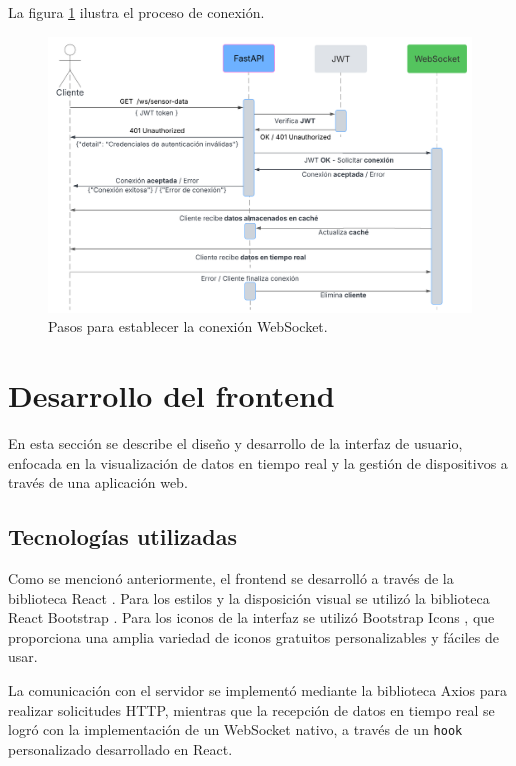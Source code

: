 La figura \ref{fig:websocket} ilustra el proceso de conexión.

\begin{figure}[H]
    \centering
    \includegraphics[width=.90\textwidth]{./Images/23.png}
    \caption{Pasos para establecer la conexión WebSocket.}
    \label{fig:websocket}
\end{figure}

\section{Desarrollo del frontend}

En esta sección se describe el diseño y desarrollo de la interfaz de usuario,
enfocada en la visualización de datos en tiempo real y la gestión de
dispositivos a través de una aplicación web.

\subsection{Tecnologías utilizadas}

Como se mencionó anteriormente, el frontend se desarrolló a través de la
biblioteca React \cite{React}. Para los estilos y la disposición visual se
utilizó la biblioteca React Bootstrap \cite{ReactBootstrap}. Para los iconos de
la interfaz se utilizó Bootstrap Icons \cite{BootstrapIcons}, que proporciona
una amplia variedad de iconos gratuitos personalizables y fáciles de usar.

La comunicación con el servidor se implementó mediante la biblioteca Axios
\cite{Axios} para realizar solicitudes HTTP, mientras que la recepción de datos
en tiempo real se logró con la implementación de un WebSocket nativo, a través
de un \texttt{hook} personalizado desarrollado en React.

